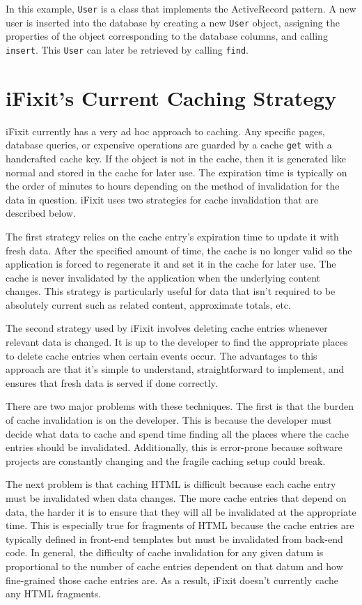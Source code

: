 \documentclass[12pt]{ucthesis}
\begin{document}
In this example, {\tt User} is a class that implements the ActiveRecord pattern.
A new user is inserted into the database by creating a new {\tt User} object, assigning the properties of the object corresponding to the database columns, and calling {\tt insert}.
This {\tt User} can later be retrieved by calling {\tt find}.


\section{iFixit's Current Caching Strategy}
\textsf{iFixit} currently has a very ad hoc approach to caching.
Any specific pages, database queries, or expensive operations are guarded by a cache {\tt get} with a handcrafted cache key.
If the object is not in the cache, then it is generated like normal and stored in the cache for later use.
The expiration time is typically on the order of minutes to hours depending on the method of invalidation for the data in question.
\textsf{iFixit} uses two strategies for cache invalidation that are described below.

The first strategy relies on the cache entry's expiration time to update it with fresh data.
After the specified amount of time, the cache is no longer valid so the application is forced to regenerate it and set it in the cache for later use.
The cache is never invalidated by the application when the underlying content changes.
This strategy is particularly useful for data that isn't required to be absolutely current such as related content, approximate totals, etc.

The second strategy used by \textsf{iFixit} involves deleting cache entries whenever relevant data is changed.
It is up to the developer to find the appropriate places to delete cache entries when certain events occur.
The advantages to this approach are that it's simple to understand, straightforward to implement, and ensures that fresh data is served if done correctly.

There are two major problems with these techniques.
The first is that the burden of cache invalidation is on the developer.
This is because the developer must decide what data to cache and spend time finding all the places where the cache entries should be invalidated.
Additionally, this is error-prone because software projects are constantly changing and the fragile caching setup could break.

The next problem is that caching HTML is difficult because each cache entry must be invalidated when data changes.
The more cache entries that depend on data, the harder it is to ensure that they will all be invalidated at the appropriate time.
This is especially true for fragments of HTML because the cache entries are typically defined in front-end templates but must be invalidated from back-end code.
In general, the difficulty of cache invalidation for any given datum is proportional to the number of cache entries dependent on that datum and how fine-grained those cache entries are.
As a result, \textsf{iFixit} doesn't currently cache any HTML fragments.
\end{document}
